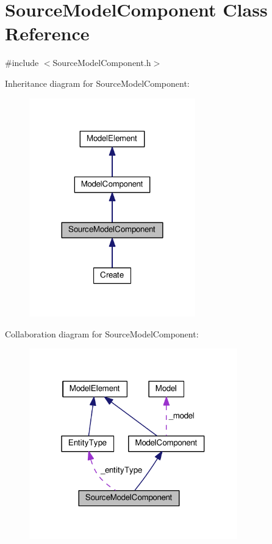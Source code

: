 \hypertarget{class_source_model_component}{}\section{Source\+Model\+Component Class Reference}
\label{class_source_model_component}


{\ttfamily \#include $<$Source\+Model\+Component.\+h$>$}



Inheritance diagram for Source\+Model\+Component\+:\nopagebreak
\begin{figure}[H]
\begin{center}
\leavevmode
\includegraphics[width=204pt]{class_source_model_component__inherit__graph}
\end{center}
\end{figure}


Collaboration diagram for Source\+Model\+Component\+:\nopagebreak
\begin{figure}[H]
\begin{center}
\leavevmode
\includegraphics[width=256pt]{class_source_model_component__coll__graph}
\end{center}
\end{figure}
